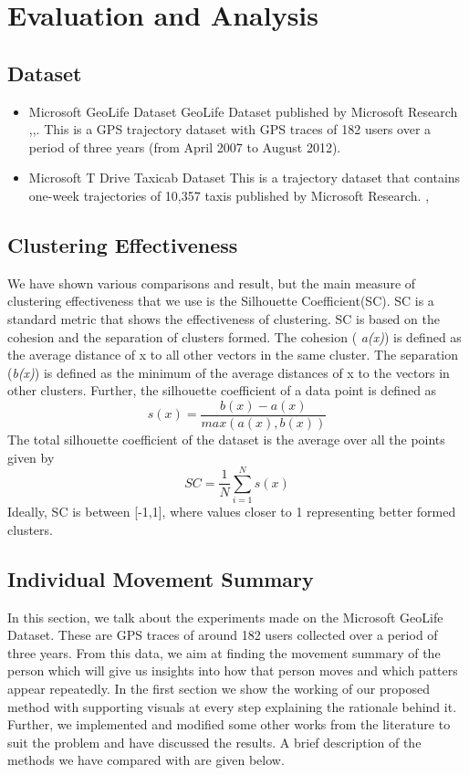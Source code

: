 \section{Evaluation and Analysis}

\subsection{Dataset}
\begin{itemize}
\item Microsoft GeoLife Dataset
GeoLife Dataset published by Microsoft Research \cite{geolife1},\cite{geolife2},\cite{geolife3}. This is a GPS trajectory dataset with GPS traces of 182 users over a period of three years (from April 2007 to August 2012). 
\item Microsoft T Drive Taxicab Dataset
This is a trajectory dataset that contains one-week trajectories of 10,357 taxis published by Microsoft Research. \cite{tdrive1} ,\cite{tdrive2}
\end{itemize}
\subsection{Clustering Effectiveness}
We have shown various comparisons and result, but the main measure of clustering effectiveness that we use is the Silhouette Coefficient(SC). SC is a standard metric that shows the effectiveness of clustering. SC is based on the cohesion and the separation of clusters formed. The cohesion ( \textit{a(x)})  is defined as the average distance of x to all other vectors in the same cluster. 
The separation (\textit{b(x)}) is defined as the minimum of the average distances of x to the vectors in other clusters.
Further, the silhouette coefficient of a data point is defined as 
\begin{equation}
s(x)=\frac{b(x)-a(x)}{max(a(x),b(x))}
\end{equation}
The total silhouette coefficient of the dataset is the average over all the points given by
\begin{equation}
SC=\frac{1}{N}\sum_{i=1}^{N}s(x)
\end{equation}
\noindent Ideally, SC is between [-1,1], where values closer to 1 representing better formed clusters. 

\subsection{Individual Movement Summary}

In this section, we talk about the experiments made on the Microsoft GeoLife Dataset. These are GPS traces of around 182 users collected over a period of three years. From this data, we aim at finding the movement summary of the person which will give us insights into how that person moves and which patters appear repeatedly. In the first section we show the working of our proposed method with supporting visuals at every step explaining the rationale behind it. Further, we implemented and modified some other works from the literature to suit the problem and have discussed the results. A brief description of the methods we have compared with are given below.

